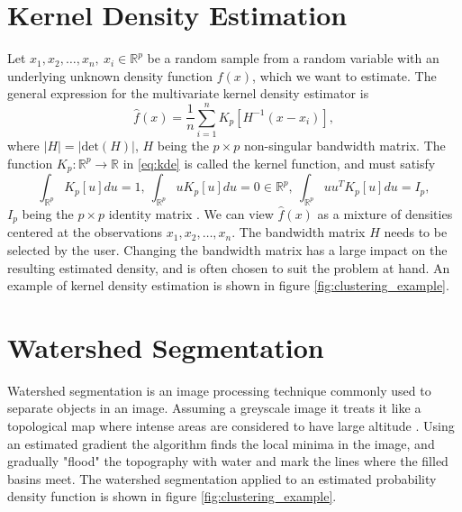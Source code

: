 \documentclass[a4paper]{memoir}
\theoremstyle{plain}
\theoremstyle{definition}
\theoremstyle{remark}
\begin{document}
\section{Kernel Density Estimation}
Let $x_1, x_2, \hdots, x_n, \ x_i \in \mathbb{R}^p$ be a random sample from a random variable with an underlying unknown density function $f(x)$, which we want to estimate.
The general expression for the multivariate kernel density estimator is \cite{simonoff}
\begin{equation}\label{eq:kde}
        \hat{f}(x)   = \frac{1}{n} \sum_{i = 1}^{n} K_p \left[ H^{-1}(x - x_i) \right],
\end{equation}
where $|H| = |\text{det} (H)|$, $H$ being the $p \times p$ non-singular bandwidth matrix.
The function $K_p : \mathbb{R}^p \rightarrow \mathbb{R}$ in \eqref{eq:kde} is called the kernel function, and must satisfy
\begin{equation*}
        \int_{\mathbb{R}^p}^{} K_p [u]du = 1, \ \int_{\mathbb{R}^p}^{}uK_p [u]du = 0 \in \mathbb{R}^p, \ \int_{\mathbb{R}^p}^{} u u^T K_p [u]du = I_p,
\end{equation*}
$I_p$ being the $p \times p$ identity matrix \cite{simonoff}.
We can view $\hat{f}(x)$ as a mixture of densities centered at the observations $x_1, x_2, \hdots, x_n$.
The bandwidth matrix $H$ needs to be selected by the user.
Changing the bandwidth matrix has a large impact on the resulting estimated density, and is often chosen to suit the problem at hand.
An example of kernel density estimation is shown in figure \ref{fig:clustering_example}.







\section{Watershed Segmentation}
Watershed segmentation is an image processing technique commonly used to separate objects in an image.
Assuming a greyscale image it treats it like a topological map where intense areas are considered to have large altitude \cite{najman}.
Using an estimated gradient the algorithm finds the local minima in the image, and gradually "flood" the topography with water and mark the lines where the filled basins meet.
The watershed segmentation applied to an estimated probability density function is shown in figure \ref{fig:clustering_example}.
\end{document}
